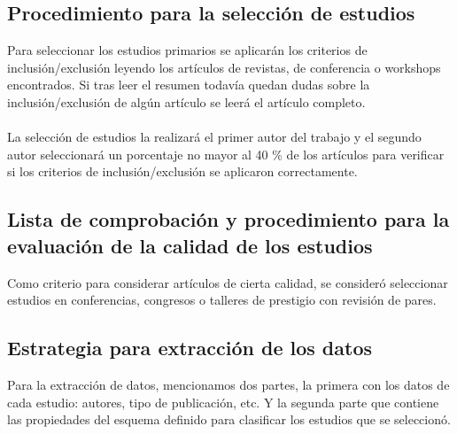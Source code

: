 \documentclass{llncs}
\begin{document}
\subsection{Procedimiento para la selección de estudios}
Para seleccionar los estudios primarios se aplicarán los criterios de inclusión/exclusión leyendo los artículos de revistas, de conferencia o workshops encontrados. Si tras leer el resumen todavía quedan dudas sobre la inclusión/exclusión de algún artículo se leerá el artículo completo.\\ \\
La selección de estudios la realizará el primer autor del trabajo y el segundo autor seleccionará un porcentaje no mayor al 40  \% de los artículos  para verificar si los criterios de inclusión/exclusión se aplicaron correctamente.

\subsection{Lista de comprobación y procedimiento para la evaluación de la calidad de los estudios}
Como criterio para considerar artículos de cierta calidad, se consideró seleccionar estudios en conferencias, congresos o talleres de prestigio con revisión de pares.

\subsection{Estrategia para extracción de los datos}
Para la extracción de datos, mencionamos dos partes, la primera con los datos de cada estudio: autores, tipo de publicación, etc. Y la segunda parte que contiene las propiedades del esquema definido para clasificar los estudios que se seleccionó.\\ \\

\end{document}
